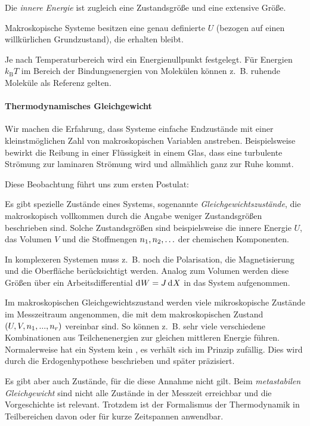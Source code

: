 Die \emph{innere Energie} ist zugleich eine Zustandsgröße und eine extensive Größe.
\begin{formal}
    Makroskopische Systeme besitzen eine genau definierte  $U$ (bezogen auf einen willkürlichen Grundzustand), die erhalten bleibt.
\end{formal}

Je nach Temperaturbereich wird ein Energienullpunkt festgelegt.
Für Energien $k_\mathrm{B}T$ im Bereich der Bindungsenergien von Molekülen können z.~B. ruhende Moleküle als Referenz gelten.


\paragraph*{Thermodynamisches Gleichgewicht}

Wir machen die Erfahrung, dass Systeme einfache Endzustände mit einer kleinstmöglichen Zahl von makroskopischen Variablen anstreben. Beispielsweise bewirkt die Reibung in einer Flüssigkeit in einem Glas, dass eine turbulente Strömung zur laminaren Strömung wird und allmählich ganz zur Ruhe kommt.

Diese Beobachtung führt uns zum ersten Postulat:
\begin{postulate}
    \label{post:gleichgewichtszustaende}
    Es gibt spezielle Zustände eines Systems, sogenannte \emph{Gleichgewichtszustände}, die makroskopisch vollkommen durch die Angabe weniger Zustandsgrößen beschrieben sind. 
    Solche Zustandsgrößen sind beispielsweise die innere Energie $U$, das Volumen $V$ und die Stoffmengen $n_1,n_2,\ldots$ der chemischen Komponenten.
\end{postulate}

In komplexeren Systemen muss z.~B. noch die Polarisation, die Magnetisierung und die Oberfläche berücksichtigt werden. Analog zum Volumen werden diese Größen über ein Arbeitsdifferential $\mathop{\mathrm{d}^{}W} = J\mathop{\mathrm{d}^{}X}$ in das System aufgenommen.

Im makroskopischen Gleichgewichtszustand werden viele mikroskopische Zustände im Messzeitraum angenommen, die mit dem makroskopischen Zustand $(U,V,n_1,...,n_r)$ vereinbar sind. So können z.~B. sehr viele verschiedene Kombinationen aus Teilchenenergien zur gleichen mittleren Energie führen. Normalerweise hat ein System kein , es verhält sich im Prinzip zufällig. Dies wird durch die Erdogenhypothese beschrieben und später präzisiert.

Es gibt aber auch Zustände, für die diese Annahme nicht gilt. Beim \emph{metastabilen Gleichgewicht} sind nicht alle Zustände in der Messzeit erreichbar und die Vorgeschichte ist relevant. Trotzdem ist der Formalismus der Thermodynamik in Teilbereichen davon oder für kurze Zeitspannen anwendbar.


